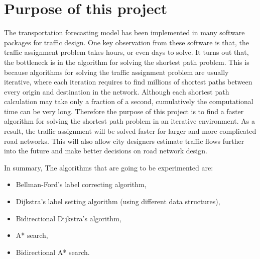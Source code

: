 \begin{comment}
Both of these methods are iterative methods that require shortest path calculations for every trip origins in the network.
It is not difficult to imagine that there would be many shortest path calculations if the network has hundreds of origins and destinations and takes some iterations to solve.
Each shortest path calculation would also be very hard to solve if the network has a few hundred intersections and a few thousand roads for a realistic city road network.
\citet{Sheffi} states that finding the shortest path is the most computation intensive component for the PE or Frank-Wolfe algorithms, 
other components in the algorithms such as updating new values and convergence check only requires a few percentages of the total running time.
Overall, speeding up shortest path calculations would significantly speed up the traffic assignment algorithms.
As a result,
traffic forecasting would be solved faster for larger and more complicated road networks,
which allow city designers predict traffic further into the future and make better decisions on road network design.
\end{comment}

\section{Purpose of this project}
The transportation forecasting model has been implemented in many software packages for traffic design.
One key observation from these software is that,
the traffic assignment problem takes hours, or even days to solve.
It turns out that,
the bottleneck is in the algorithm for solving the shortest path problem.
This is because algorithms for solving the traffic assignment problem are usually iterative,
where each iteration requires to find millions of shortest paths between every origin and destination in the network.
Although each shortest path calculation may take only a fraction of a second,
cumulatively the computational time can be very long.
Therefore the purpose of this project is to find a faster algorithm for solving the shortest path problem in an iterative environment.
As a result, the traffic assignment will be solved faster
for larger and more complicated road networks.
This will also allow city designers estimate traffic flows further into the future and make better decisions on road network design.

In summary,
The algorithms that are going to be experimented are:
\begin{itemize}
    \item Bellman-Ford's label correcting algorithm,
    \item Dijkstra's label setting algorithm (using different data structures),
    \item Bidirectional Dijkstra's algorithm,
    \item A* search,
    \item Bidirectional A* search.
\end{itemize}

